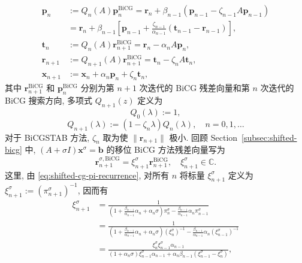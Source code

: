 \[\begin{aligned}\bm p_n&:=Q_n(A)\bm p_n^{\mathrm{BiCG}}=\bm r_n+\beta_{n-1}(\bm p_{n-1}-\zeta_{n-1}A\bm p_{n-1})\\&=\bm r_n+\beta_{n-1}\left[\bm p_{n-1}+\frac{\zeta_{n-1}}{\alpha_{n-1}}(\bm t_{n-1}-\bm r_{n-1})\right],\\
\bm t_n&:=Q_n(A)\bm r_{n+1}^{\mathrm{BiCG}}=\bm r_n-\alpha_nA\bm p_n,\\
\bm r_{n+1}&:=Q_{n+1}(A)\bm r_{n+1}^{\mathrm{BiCG}}=\bm t_n-\zeta_nA\bm t_n,\\
\bm x_{n+1}&:=\bm x_n+\alpha_n\bm p_n+\zeta_n\bm t_n,\end{aligned}\]
{其中 $\bm r_{n+1}^{\mathrm{BiCG}}$ 和 $\bm p_n^{\mathrm{BiCG}}$ 分别为第 $n+1$ 次迭代的 BiCG 残差向量和第 $n$ 次迭代的 BiCG 搜索方向, 多项式 $Q_{n+1}(z)$ 定义为}
\begin{equation}\label{eq:shifted-bicgstab-seed-polynomial-initial}Q_0(\lambda):=1,\end{equation}
\begin{equation}\label{eq:shifted-bicgstab-seed-polynomial-recurrence}Q_{n+1}(\lambda):=(1-\zeta_n\lambda)Q_n(\lambda),\quad n=0,1,\ldots\end{equation}
{对于 BiCGSTAB 方法, $\zeta_n$ 取为使 $\|\bm r_{n+1}\|$ 极小. 回顾 Section\ \ref{subsec:shifted-bicg} 中, $(A+\sigma I)\bm x^{\sigma}=\bm b$ 的移位 BiCG 方法残差向量写为}
\[\bm r_{n+1}^{\sigma,\mathrm{BiCG}}=\xi_{n+1}^{\sigma}\bm r_{n+1}^{\mathrm{BiCG}},\quad\xi_{n+1}^{\sigma}\in\mathbb C.\]
{这里, 由 \eqref{eq:shifted-cg-pi-recurrence}, 对所有 $n$ 将标量 $\xi_{n+1}^{\sigma}$ 定义为 $\xi_{n+1}^{\sigma}:=(\pi_{n+1}^{\sigma})^{-1}$, 因而有}
\begin{equation}\label{eq:shifted-bicgstab-xi-recurrence}\begin{aligned}\xi_{n+1}^{\sigma}&=\frac1{\left(1+\frac{\beta_{n-1}}{\alpha_{n-1}}\alpha_n+\alpha_n\sigma\right)\pi_n^{\sigma}-\frac{\beta_{n-1}}{\alpha_{n-1}}\alpha_n\pi_{n-1}^{\sigma}}\\
&=\frac1{\left(1+\frac{\beta_{n-1}}{\alpha_{n-1}}\alpha_n+\alpha_n\sigma\right)(\xi_n^{\sigma})^{-1}-\frac{\beta_{n-1}}{\alpha_{n-1}}\alpha_n(\xi_{n-1}^{\sigma})^{-1}}\\
&=\frac{\xi_n^{\sigma}\xi_{n-1}^{\sigma}\alpha_{n-1}}{(1+\alpha_n\sigma)\xi_{n-1}^{\sigma}\alpha_{n-1}+\alpha_n\beta_{n-1}(\xi_{n-1}^{\sigma}-\xi_n^{\sigma})},\end{aligned}\end{equation}
